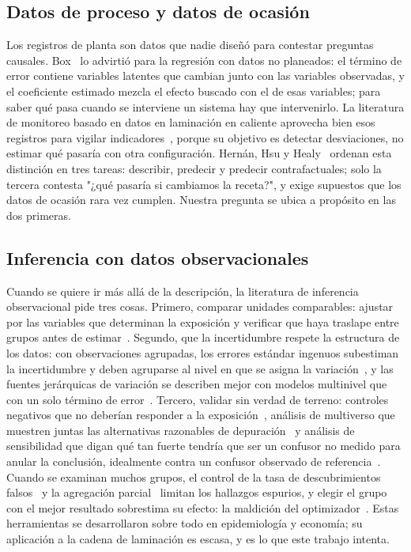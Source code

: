 \subsection{Datos de proceso y datos de ocasión}
Los registros de planta son datos que nadie diseñó para contestar preguntas causales. Box~\cite{box1966} lo advirtió
para la regresión con datos no planeados: el término de error contiene variables latentes que cambian junto con las
variables observadas, y el coeficiente estimado mezcla el efecto buscado con el de esas variables; para saber qué
pasa cuando se interviene un sistema hay que intervenirlo. La literatura de monitoreo basado en datos en laminación
en caliente aprovecha bien esos registros para vigilar indicadores~\cite{peng2014}, porque su objetivo es detectar
desviaciones, no estimar qué pasaría con otra configuración. Hernán, Hsu y Healy~\cite{hernan2019} ordenan esta
distinción en tres tareas: describir, predecir y predecir contrafactuales; solo la tercera contesta "¿qué pasaría si
cambiamos la receta?", y exige supuestos que los datos de ocasión rara vez cumplen. Nuestra pregunta se ubica a
propósito en las dos primeras.

\subsection{Inferencia con datos observacionales}
Cuando se quiere ir más allá de la descripción, la literatura de inferencia observacional pide tres cosas. Primero,
comparar unidades comparables: ajustar por las variables que determinan la exposición y verificar que haya
traslape entre grupos antes de estimar~\cite{rosenbaum1983}. Segundo, que la incertidumbre respete la estructura de
los datos: con observaciones agrupadas, los errores estándar ingenuos subestiman la incertidumbre y deben agruparse
al nivel en que se asigna la variación~\cite{cameron2015}, y las fuentes jerárquicas de variación se describen mejor
con modelos multinivel que con un solo término de error~\cite{gelman2007}. Tercero, validar sin verdad de terreno:
controles negativos que no deberían responder a la exposición~\cite{lipsitch2010}, análisis de multiverso que muestren
juntas las alternativas razonables de depuración~\cite{steegen2016} y análisis de sensibilidad que digan qué tan
fuerte tendría que ser un confusor no medido para anular la conclusión, idealmente contra un confusor observado de
referencia~\cite{cinelli2020,vanderweele2017}. Cuando se examinan muchos grupos, el control de la tasa de
descubrimientos falsos~\cite{benjamini1995} y la agregación parcial~\cite{gelman2012} limitan los hallazgos espurios,
y elegir el grupo con el mejor resultado sobrestima su efecto: la maldición del optimizador~\cite{smith2006}. Estas
herramientas se desarrollaron sobre todo en epidemiología y economía; su aplicación a la cadena de laminación es
escasa, y es lo que este trabajo intenta.

